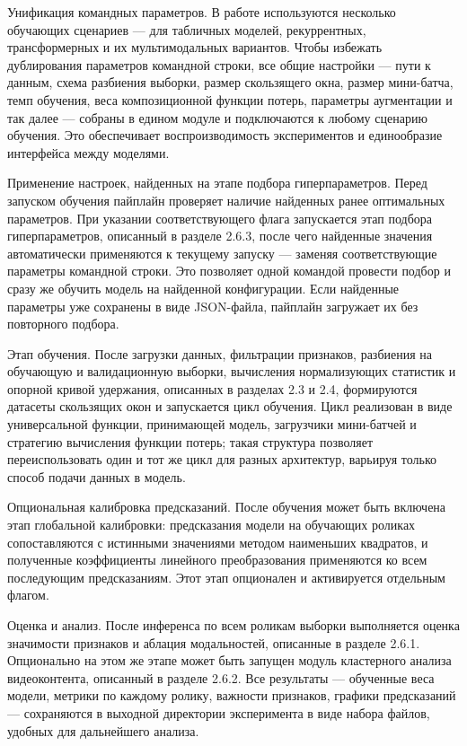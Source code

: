 \documentclass[times]{itmo-student-thesis}
\begin{document}
Унификация командных параметров. В работе используются несколько обучающих сценариев — для табличных моделей, рекуррентных, трансформерных и их мультимодальных вариантов. Чтобы избежать дублирования параметров командной строки, все общие настройки — пути к данным, схема разбиения выборки, размер скользящего окна, размер мини-батча, темп обучения, веса композиционной функции потерь, параметры аугментации и так далее — собраны в едином модуле и подключаются к любому сценарию обучения. Это обеспечивает воспроизводимость экспериментов и единообразие интерфейса между моделями.

Применение настроек, найденных на этапе подбора гиперпараметров. Перед запуском обучения пайплайн проверяет наличие найденных ранее оптимальных параметров. При указании соответствующего флага запускается этап подбора гиперпараметров, описанный в разделе 2.6.3, после чего найденные значения автоматически применяются к текущему запуску — заменяя соответствующие параметры командной строки. Это позволяет одной командой провести подбор и сразу же обучить модель на найденной конфигурации. Если найденные параметры уже сохранены в виде JSON-файла, пайплайн загружает их без повторного подбора.

Этап обучения. После загрузки данных, фильтрации признаков, разбиения на обучающую и валидационную выборки, вычисления нормализующих статистик и опорной кривой удержания, описанных в разделах 2.3 и 2.4, формируются датасеты скользящих окон и запускается цикл обучения. Цикл реализован в виде универсальной функции, принимающей модель, загрузчики мини-батчей и стратегию вычисления функции потерь; такая структура позволяет переиспользовать один и тот же цикл для разных архитектур, варьируя только способ подачи данных в модель.

Опциональная калибровка предсказаний. После обучения может быть включена этап глобальной калибровки: предсказания модели на обучающих роликах сопоставляются с истинными значениями методом наименьших квадратов, и полученные коэффициенты линейного преобразования применяются ко всем последующим предсказаниям. Этот этап опционален и активируется отдельным флагом.

Оценка и анализ. После инференса по всем роликам выборки выполняется оценка значимости признаков и аблация модальностей, описанные в разделе 2.6.1. Опционально на этом же этапе может быть запущен модуль кластерного анализа видеоконтента, описанный в разделе 2.6.2. Все результаты — обученные веса модели, метрики по каждому ролику, важности признаков, графики предсказаний — сохраняются в выходной директории эксперимента в виде набора файлов, удобных для дальнейшего анализа.
\end{document}
